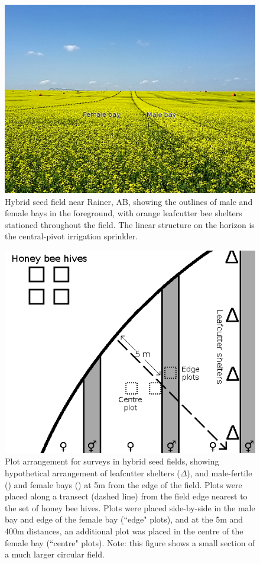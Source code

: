 \documentclass[12pt]{article} %
\begin{document}
\begin{figure}[h]
    \centering
    \includegraphics[width=\textwidth,keepaspectratio=true]{seedfieldBays.jpg}
    \caption[Hybrid seed field production field near Rainer, AB]{Hybrid seed field near Rainer, AB, showing the outlines of male and female bays in the foreground, with orange leafcutter bee shelters stationed throughout the field. The linear structure on the horizon is the central-pivot irrigation sprinkler.}
\end{figure}

\begin{figure}[h]
    \centering
    \includegraphics[width=\textwidth,keepaspectratio=true]{seedfieldPlots.png}
    \caption[Plot arrangement for surveys in hybrid seed fields]{Plot arrangement for surveys in hybrid seed fields, showing hypothetical arrangement of leafcutter shelters ($\Delta$), and male-fertile (\Hermaphrodite) and female bays (\Female) at 5m from the edge of the field. Plots were placed along a transect (dashed line) from the field edge nearest to the set of honey bee hives. Plots were placed side-by-side in the male bay and edge of the female bay (``edge" plots), and at the 5m and 400m distances, an additional plot was placed in the centre of the female bay (``centre" plots). Note: this figure shows a small section of a much larger circular field.}
\end{figure}
\end{document}

